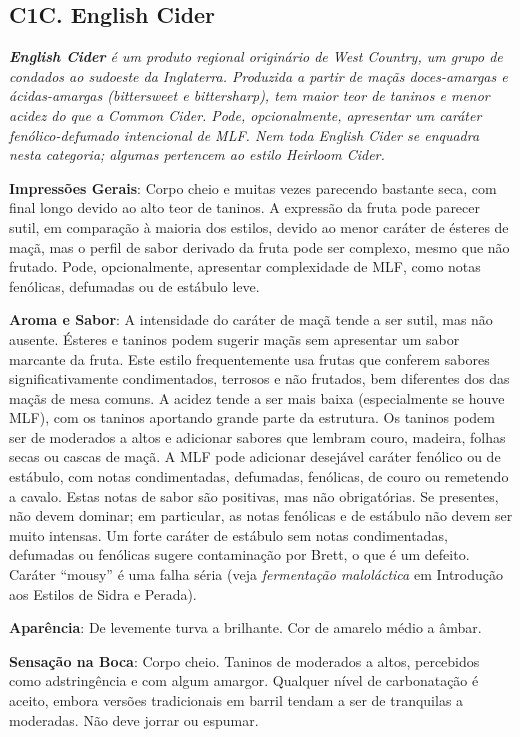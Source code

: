 \subsection*{C1C. English Cider}

\textit{\textbf{English Cider} é um produto regional originário de West Country, um grupo de condados ao sudoeste da Inglaterra. Produzida a partir de maçãs doces-amargas e ácidas-amargas (\textit{bittersweet} e \textit{bittersharp}), tem maior teor de taninos e menor acidez do que a Common Cider. Pode, opcionalmente, apresentar um caráter fenólico-defumado intencional de MLF. Nem toda English Cider se enquadra nesta categoria; algumas pertencem ao estilo Heirloom Cider.}

\textbf{Impressões Gerais}: Corpo cheio e muitas vezes parecendo bastante seca, com final longo devido ao alto teor de taninos. A expressão da fruta pode parecer sutil, em comparação à maioria dos estilos, devido ao menor caráter de ésteres de maçã, mas o perfil de sabor derivado da fruta pode ser complexo, mesmo que não frutado. Pode, opcionalmente, apresentar complexidade de MLF, como notas fenólicas, defumadas ou de estábulo leve.

\textbf{Aroma e Sabor}: A intensidade do caráter de maçã tende a ser sutil, mas não ausente. Ésteres e taninos podem sugerir maçãs sem apresentar um sabor marcante da fruta. Este estilo frequentemente usa frutas que conferem sabores significativamente condimentados, terrosos e não frutados, bem diferentes dos das maçãs de mesa comuns. A acidez tende a ser mais baixa (especialmente se houve MLF), com os taninos aportando grande parte da estrutura. Os taninos podem ser de moderados a altos e adicionar sabores que lembram couro, madeira, folhas secas ou cascas de maçã. A MLF pode adicionar desejável caráter fenólico ou de estábulo, com notas condimentadas, defumadas, fenólicas, de couro ou remetendo a cavalo. Estas notas de sabor são positivas, mas não obrigatórias. Se presentes, não devem dominar; em particular, as notas fenólicas e de estábulo não devem ser muito intensas. Um forte caráter de estábulo sem notas condimentadas, defumadas ou fenólicas sugere contaminação por Brett, o que é um defeito. Caráter “mousy” é uma falha séria (veja \textit{fermentação maloláctica} em Introdução aos Estilos de Sidra e Perada).

\textbf{Aparência}: De levemente turva a brilhante. Cor de amarelo médio a âmbar.

\textbf{Sensação na Boca}: Corpo cheio. Taninos de moderados a altos, percebidos como adstringência e com algum amargor. Qualquer nível de carbonatação é aceito, embora versões tradicionais em barril tendam a ser de tranquilas a moderadas. Não deve jorrar ou espumar.

